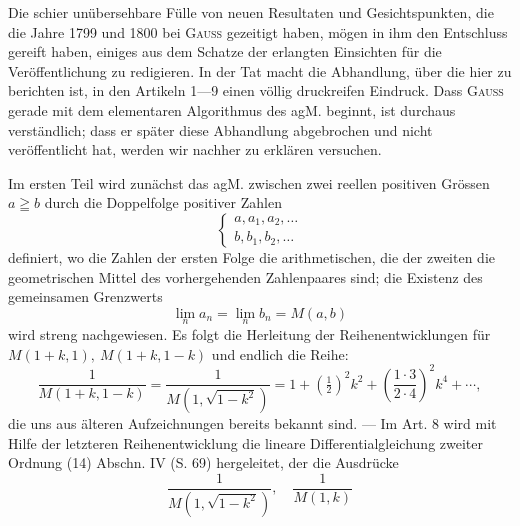 \par\medskip
\begin{center}\end{center}
\noindent\hspace*{\parindent}Die schier unübersehbare Fülle von neuen Resultaten und Gesichtspunkten,
die die Jahre 1799 und 1800 bei \textsc{Gauss} gezeitigt haben, mögen in
ihm den Entschluss gereift haben, einiges aus dem Schatze der erlangten Einsichten
für die Veröffentlichung zu redigieren. In der Tat macht die Abhandlung,
über die hier zu berichten ist, in den Artikeln 1—9 einen völlig
druckreifen Eindruck. Dass \textsc{Gauss} gerade mit dem elementaren Algorithmus
des agM. beginnt, ist durchaus verständlich; dass er später diese Abhandlung
abgebrochen und nicht veröffentlicht hat, werden wir nachher zu erklären
versuchen.\par
\clearpage{}
\indent Im ersten Teil wird zunächst das agM. zwischen zwei reellen positiven
Grössen \(a\geqq b\) durch die Doppelfolge positiver Zahlen
\begingroup\makeatletter\tagsleft@true\let\veqno\leqno\makeatother
\begin{equation*}
\left\{\begin{array}{l}a,a_1,a_2,\ldots\\b,b_1,b_2,\ldots\end{array}\right.\tag{4}
\end{equation*}
\endgroup
\noindent definiert, wo die Zahlen der ersten Folge die arithmetischen, die der zweiten
die geometrischen Mittel des vorhergehenden Zahlenpaares sind; die Existenz
des gemeinsamen Grenzwerts
\[
\lim_n a_n=\lim_n b_n=M(a,b)
\]
\noindent wird streng nachgewiesen. Es folgt die Herleitung der Reihenentwicklungen
für \(M(1+k,1),\ M(1+k,1-k)\) und endlich die Reihe:
\begingroup\makeatletter\tagsleft@true\let\veqno\leqno\makeatother
\begin{equation*}
\frac1{M(1+k,1-k)}=\frac1{M(1,\sqrt{1-k^2})}
=1+(\tfrac12)^2k^2+\left(\frac{1\cdot3}{2\cdot4}\right)^2k^4+\cdots,\tag{5}
\end{equation*}
\endgroup
\noindent die uns aus älteren Aufzeichnungen bereits bekannt sind. — Im Art. 8 wird
mit Hilfe der letzteren Reihenentwicklung die lineare Differentialgleichung
zweiter Ordnung (14) Abschn. IV (S. 69) hergeleitet, der die Ausdrücke
\begingroup\makeatletter\tagsleft@true\let\veqno\leqno\makeatother
\begin{equation*}
\frac1{M(1,\sqrt{1-k^2})},\quad\frac1{M(1,k)}\tag{6}
\end{equation*}
